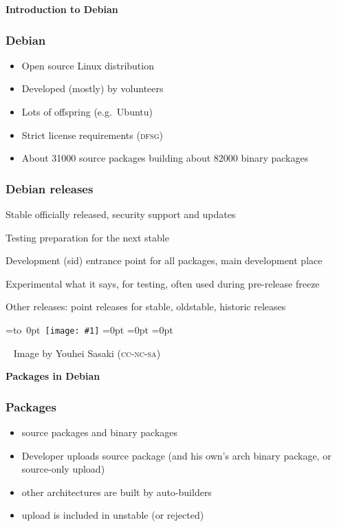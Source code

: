\documentclass[hyperref]{beamer}
\newcommand{\acro}[1]{\textsc{\MakeLowercase{#1}}}
\newcommand\img[4]{%
  \bgroup%
  \setbox0=\hbox{\hskip #3\vbox to 0pt{\vskip #4 \texttt{[image: \#1]}}}%
  \dp0=0pt %
  \ht0=0pt %
  \wd0=0pt %
  \hbox{\box0}
  \egroup}
\newcommand{\cutin}[1]{%
\begin{frame}[c]\begin{center}{\Large\bf\color{myblue}#1}\end{center}\end{frame}}
\def\bis{\\[\bigskipamount]}
\begin{document}
\cutin{Introduction to Debian}

\begin{frame}
  \frametitle{Debian}
  \begin{itemize}
  \item Open source Linux distribution\bis
  \item Developed (mostly) by volunteers\bis
  \item Lots of offspring (e.g.\ Ubuntu)\bis
  \item Strict license requirements (\acro{DFSG})\bis
  \item About 31000 source packages building about 82000 binary packages
  \end{itemize}
\end{frame}

\begin{frame}
  \frametitle{Debian releases}
  \begin{block}{Stable}
    officially released, security support and updates
  \end{block}

  \pause
  \begin{block}{Testing}
    preparation for the next stable
  \end{block}

  \pause
  \begin{block}{Development (sid)}
    entrance point for all packages, main development place
  \end{block}

  \pause
  \begin{block}{Experimental}
    what it says, for testing, often used during pre-release freeze
  \end{block}
  \pause
  Other releases: point releases for stable, oldstable, historic releases
\end{frame}

\begin{frame}

  \img{debian-update-jessie-stretch-buster-12-638.png}{8cm}{-0.5cm}{0cm}

  \hbox{~}
  \vfill
  \vspace{6cm}
  Image by Youhei Sasaki (\acro{CC-NC-SA})
\end{frame}

\cutin{Packages in Debian}

\begin{frame}
  \frametitle{Packages}
  \begin{itemize}
  \item source packages and binary packages\bis
  \item Developer uploads source package (and his own's arch binary
    package, or source-only upload)\bis
  \item other architectures are built by auto-builders\bis
  \item upload is included in unstable (or rejected)
  \end{itemize}
\end{frame}
\end{document}
